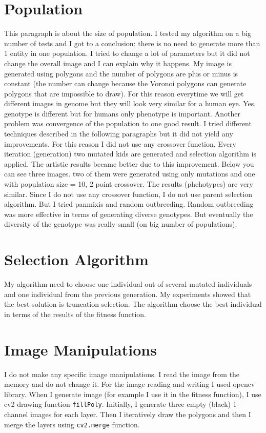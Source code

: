 \documentclass{article}
\begin{document}
\section{Population}
This paragraph is about the size of population. I tested my algorithm on a big number of tests and I got to a conclusion: there is no need to generate more than 1 entity in one population. I tried to change a lot of parameters but it did not change the overall image and I can explain why it happens. My image is generated using polygons and the number of polygons are plus or minus is constant (the number can change because the Voronoi polygons can generate polygons that are impossible to draw). For this reason everytime we will get different images in genome but they will look very similar for a human eye. Yes, genotype is different but for humans only phenotype is important. Another problem was convergence of the population to one good result. I tried different techniques described in the following paragraphs but it did not yield any improvements. For this reason I did not use any crossover function. Every iteration (generation) two mutated kids are generated and selection algorithm is applied. The artistic results became better due to this improvement. Below you can see three images. two of them were generated using only mutations and one with population size = 10, 2 point crossover. The results (phehotypes) are very similar. Since I do not use any crossover function, I do not use parent selection algorithm. But I tried panmixis and random outbreeding. Random outbreeding was more effective in terms of generating diverse genotypes. But eventually the diversity of the genotype was really small (on big number of populations).
\section{Selection Algorithm}
My algorithm need to choose one individual out of several mutated individuals and one individual from the previous generation. My experiments showed that the best solution is truncation selection. The algorithm choose the best individual in terms of the results of the fitness function. 


\section{Image Manipulations}
I do not make any specific image manipulations. I read the image from the memory and do not change it. For the image reading and writing I used opencv library. When I generate image (for example I use it in the fitness function), I use cv2 drawing function \texttt{fillPoly}. Initially, I generate three empty (black) 1-channel images for each layer. Then I iteratively draw the polygons and then I merge the layers using \texttt{cv2.merge} function. 
\end{document}
